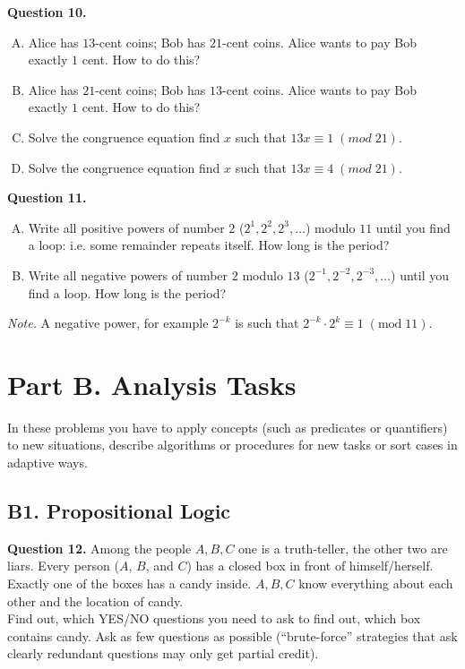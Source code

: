 \documentclass[jou]{apa6}
\begin{document}
\vspace{6pt}
{\bf Question 10.} 
\begin{enumerate}[(A)]
\item Alice has $13$-cent coins; Bob has $21$-cent coins. 
Alice wants to pay Bob exactly $1$ cent. How to do this?
\item Alice has $21$-cent coins; Bob has $13$-cent coins. 
Alice wants to pay Bob exactly $1$ cent. How to do this?
\item Solve the congruence equation \textendash{} find
$x$ such that $13x \equiv 1\;(mod\;21)$. 
\item Solve the congruence equation \textendash{} find
$x$ such that $13x \equiv 4\;(mod\;21)$. 
\end{enumerate}


\vspace{6pt}
{\bf Question 11.} 
\begin{enumerate}[(A)]
\item Write all positive powers of number $2$ ($2^1, 2^2, 2^3,\ldots$) modulo $11$ until 
you find a loop: i.e. some remainder repeats itself. How long is the period?
\item Write all negative powers of number $2$ modulo $13$ ($2^{-1},2^{-2},2^{-3},\ldots$) until 
you find a loop. How long is the period?
\end{enumerate}

{\em Note.} A negative power, for example $2^{-k}$ is such that $2^{-k}\cdot 2^k \equiv 1\;(\text{mod}\;11)$. 





\section{Part B. Analysis Tasks}

In these problems you have to apply concepts 
(such as predicates or quantifiers) to new situations, 
describe algorithms or procedures for new tasks
or sort cases in adaptive ways.


\subsection{B1. Propositional Logic}

{\bf Question 12.}
Among the people $A,B,C$ one is a truth-teller, 
the other two are liars. 
Every person ($A$, $B$, and $C$) has a closed box
in front of himself/herself. Exactly one of the 
boxes has a candy inside. $A,B,C$ know everything 
about each other and the location of candy.\\
Find out, which YES/NO questions you 
need to ask to find out, which box contains candy. 
Ask as few questions as possible 
(``brute-force'' strategies that ask clearly redundant
questions may only get partial credit). 
\end{document}

